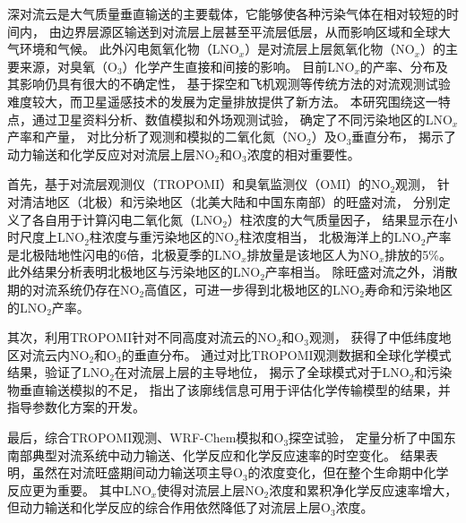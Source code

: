 
\abstract
{
深对流云是大气质量垂直输送的主要载体，它能够使各种污染气体在相对较短的时间内，
由边界层源区输送到对流层上层甚至平流层低层，从而影响区域和全球大气环境和气候。
此外闪电氮氧化物（LNO$_x$）是对流层上层氮氧化物（NO$_x$）的主要来源，对臭氧（O$_3$）化学产生直接和间接的影响。
目前LNO$_x$的产率、分布及其影响仍具有很大的不确定性，
基于探空和飞机观测等传统方法的对流观测试验难度较大，而卫星遥感技术的发展为定量排放提供了新方法。
本研究围绕这一特点，通过卫星资料分析、数值模拟和外场观测试验，
确定了不同污染地区的LNO$_x$产率和产量，
对比分析了观测和模拟的二氧化氮（NO$_2$）及O$_3$垂直分布，
揭示了动力输送和化学反应对对流层上层NO$_2$和O$_3$浓度的相对重要性。

首先，基于对流层观测仪（TROPOMI）和臭氧监测仪（OMI）的NO$_2$观测，
针对清洁地区（北极）和污染地区（北美大陆和中国东南部）的旺盛对流，
分别定义了各自用于计算闪电二氧化氮（LNO$_2$）柱浓度的大气质量因子，
结果显示在小时尺度上LNO$_2$柱浓度与重污染地区的NO$_2$柱浓度相当，
北极海洋上的LNO$_2$产率是北极陆地性闪电的6倍，北极夏季的LNO$_x$排放量是该地区人为NO$_x$排放的5\%。
此外结果分析表明北极地区与污染地区的LNO$_2$产率相当。
除旺盛对流之外，消散期的对流系统仍存在NO$_2$高值区，可进一步得到北极地区的LNO$_2$寿命和污染地区的LNO$_2$产率。

其次，利用TROPOMI针对不同高度对流云的NO$_2$和O$_3$观测，
获得了中低纬度地区对流云内NO$_2$和O$_3$的垂直分布。
通过对比TROPOMI观测数据和全球化学模式结果，验证了LNO$_2$在对流层上层的主导地位，
揭示了全球模式对于LNO$_2$和污染物垂直输送模拟的不足，
指出了该廓线信息可用于评估化学传输模型的结果，并指导参数化方案的开发。

最后，综合TROPOMI观测、WRF-Chem模拟和O$_3$探空试验，
定量分析了中国东南部典型对流系统中动力输送、化学反应和化学反应速率的时空变化。
结果表明，虽然在对流旺盛期间动力输送项主导O$_3$的浓度变化，但在整个生命期中化学反应更为重要。
其中LNO$_x$使得对流层上层NO$_2$浓度和累积净化学反应速率增大，但动力输送和化学反应的综合作用依然降低了对流层上层O$_3$浓度。
}
